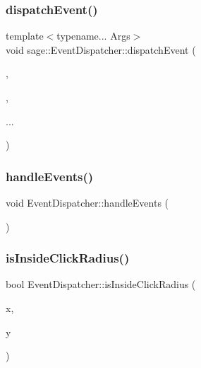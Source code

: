 \subsubsection{\texorpdfstring{dispatchEvent()}{dispatchEvent()}\hspace{0.1cm}{\footnotesize\ttfamily [2/2]}}
{\footnotesize\ttfamily template$<$typename... Args$>$ \\
void sage\+::\+Event\+Dispatcher\+::dispatch\+Event (\begin{DoxyParamCaption}\item[{\mbox{\hyperlink{namespacesage_ad2c7b0e1ebf67f572d43620e6b07aa13}{Node\+Event}}}]{,  }\item[{std\+::function$<$ bool(\mbox{\hyperlink{classsage_1_1Node}{Node}} $\ast$, Args...)$>$ \&\&}]{,  }\item[{Args \&\&}]{... }\end{DoxyParamCaption})}

\mbox{\label{classsage_1_1EventDispatcher_af94b0101f87f16334c1d32ea7a43c02a}} 
\subsubsection{\texorpdfstring{handleEvents()}{handleEvents()}}
{\footnotesize\ttfamily void Event\+Dispatcher\+::handle\+Events (\begin{DoxyParamCaption}{ }\end{DoxyParamCaption})}

\mbox{\label{classsage_1_1EventDispatcher_a918e15fc278d82e1826c5da31b6cc897}} 
\subsubsection{\texorpdfstring{isInsideClickRadius()}{isInsideClickRadius()}}
{\footnotesize\ttfamily bool Event\+Dispatcher\+::is\+Inside\+Click\+Radius (\begin{DoxyParamCaption}\item[{int}]{x,  }\item[{int}]{y }\end{DoxyParamCaption})\hspace{0.3cm}{\ttfamily [private]}}

